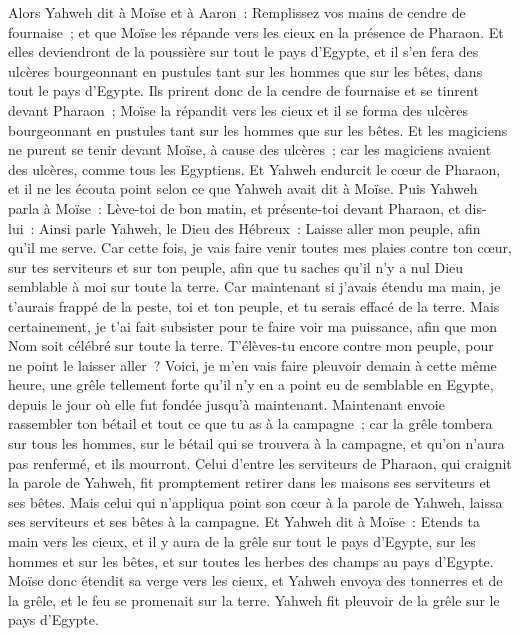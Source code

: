 \begin{multicols}{2}
Alors Yahweh dit à Moïse et à Aaron~: Remplissez vos mains de cendre de fournaise~; et que Moïse les répande vers les cieux en la présence de Pharaon.
Et elles deviendront de la poussière sur tout le pays d'Egypte, et il s'en fera des ulcères bourgeonnant en pustules tant sur les hommes que sur les bêtes, dans tout le pays d'Egypte.
Ils prirent donc de la cendre de fournaise et se tinrent devant Pharaon~; Moïse la répandit vers les cieux et il se forma des ulcères bourgeonnant en pustules tant sur les hommes que sur les bêtes.
 Et les magiciens ne purent se tenir devant Moïse, à cause des ulcères~; car les magiciens avaient des ulcères, comme tous les Egyptiens.
 Et Yahweh endurcit le cœur de Pharaon, et il ne les écouta point selon ce que Yahweh avait dit à Moïse.
Puis Yahweh parla à Moïse~: Lève-toi de bon matin, et présente-toi devant Pharaon, et dis-lui~: Ainsi parle Yahweh, le Dieu des Hébreux~: Laisse aller mon peuple, afin qu'il me serve.
Car cette fois, je vais faire venir toutes mes plaies contre ton cœur, sur tes serviteurs et sur ton peuple, afin que tu saches qu'il n'y a nul Dieu semblable à moi sur toute la terre.
Car maintenant si j'avais étendu ma main, je t'aurais frappé de la peste, toi et ton peuple, et tu serais effacé de la terre.
Mais certainement, je t'ai fait subsister pour te faire voir ma puissance, afin que mon Nom soit célébré sur toute la terre.
T'élèves-tu encore contre mon peuple, pour ne point le laisser aller~?
Voici, je m'en vais faire pleuvoir demain à cette même heure, une grêle tellement forte qu'il n'y en a point eu de semblable en Egypte, depuis le jour où elle fut fondée jusqu'à maintenant.
Maintenant envoie rassembler ton bétail et tout ce que tu as à la campagne~; car la grêle tombera sur tous les hommes, sur le bétail qui se trouvera à la campagne, et qu'on n'aura pas renfermé, et ils mourront.
Celui d'entre les serviteurs de Pharaon, qui craignit la parole de Yahweh, fit promptement retirer dans les maisons ses serviteurs et ses bêtes.
Mais celui qui n'appliqua point son cœur à la parole de Yahweh, laissa ses serviteurs et ses bêtes à la campagne.
Et Yahweh dit à Moïse~: Etends ta main vers les cieux, et il y aura de la grêle sur tout le pays d'Egypte, sur les hommes et sur les bêtes, et sur toutes les herbes des champs au pays d'Egypte.
Moïse donc étendit sa verge vers les cieux, et Yahweh envoya des tonnerres et de la grêle, et le feu se promenait sur la terre. Yahweh fit pleuvoir de la grêle sur le pays d'Egypte.

\end{multicols}
